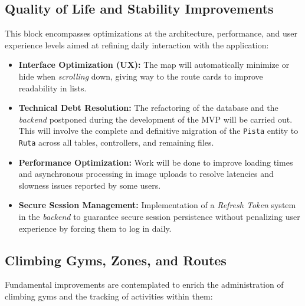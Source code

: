 \subsection{Quality of Life and Stability Improvements} This block encompasses optimizations at the architecture, performance, and user experience levels aimed at refining daily interaction with the application: 

\begin{itemize}
\item \textbf{Interface Optimization (UX):} The map will automatically minimize or hide when \textit{scrolling} down, giving way to the route cards to improve readability in lists. \item \textbf{Technical Debt Resolution:} The refactoring of the database and the \textit{backend} postponed during the development of the MVP will be carried out. This will involve the complete and definitive migration of the \texttt{Pista} entity to \texttt{Ruta} across all tables, controllers, and remaining files. \item \textbf{Performance Optimization:} Work will be done to improve loading times and asynchronous processing in image uploads to resolve latencies and slowness issues reported by some users. \item \textbf{Secure Session Management:} Implementation of a \textit{Refresh Token} system in the \textit{backend} to guarantee secure session persistence without penalizing user experience by forcing them to log in daily. 
\end{itemize}

\subsection{Climbing Gyms, Zones, and Routes} Fundamental improvements are contemplated to enrich the administration of climbing gyms and the tracking of activities within them: 

